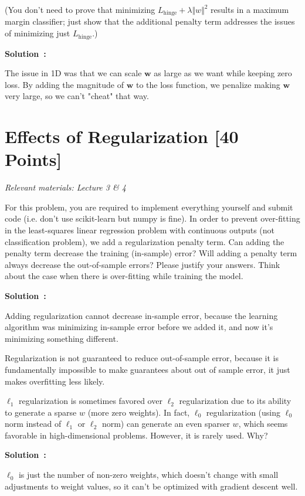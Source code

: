 \documentclass{article}
\newcounter{problem}[section]
\newenvironment{solution}[1][]
    {\par\medskip \begin{mdframed}\textbf{Solution~\Alph{problem}#1:} \begin{em}}
    {\end{em}\medskip\end{mdframed}\medskip}
\begin{document}
(You don't need to prove that minimizing $L_\text{hinge} + \lambda\Vert w \Vert^2$ results in a maximum margin classifier; just show that the additional penalty term addresses the issues of minimizing just $L_\text{hinge}$.)

\begin{solution}
  The issue in 1D was that we can scale $\mathbf{w}$ as large as we want while keeping zero loss.
  By adding the magnitude of $\mathbf{w}$ to the loss function, we penalize making $\mathbf{w}$ very large, so we can't "cheat" that way.
\end{solution}

\newpage
\section{Effects of Regularization [40 Points]}
\textit{Relevant materials: Lecture 3 \& 4}

For this problem, you are required to implement everything yourself and submit code (i.e. don't use scikit-learn but numpy is fine).
\indent\problem[4] 
In order to prevent over-fitting in the least-squares linear regression problem with continuous outputs (not classification problem), we add a regularization penalty term.
Can adding the penalty term decrease the training (in-sample) error?
Will adding a penalty term always decrease the out-of-sample errors?
Please justify your answers. Think about the case when there is over-fitting while training the model.

\begin{solution}
  Adding regularization cannot decrease in-sample error, because the learning algorithm was minimizing in-sample error before we added it, and now it's minimizing something different.

  Regularization is not guaranteed to reduce out-of-sample error, because it is fundamentally impossible to make guarantees about out of sample error, it just makes overfitting less likely.
\end{solution}

\problem[4]
$\ell_1$ regularization is sometimes favored over $\ell_2$ regularization due to its ability to generate a sparse $w$ (more zero weights).
In fact, $\ell_0$ regularization (using $\ell_0$ norm instead of $\ell_1$ or $\ell_2$ norm) can generate an even sparser $w$, which seems favorable in high-dimensional problems.
However, it is rarely used.  Why?

\begin{solution}
  $\ell_0$ is just the number of non-zero weights, which doesn't change with small adjustments to weight values, so it can't be optimized with gradient descent well.
\end{solution}
\end{document}
